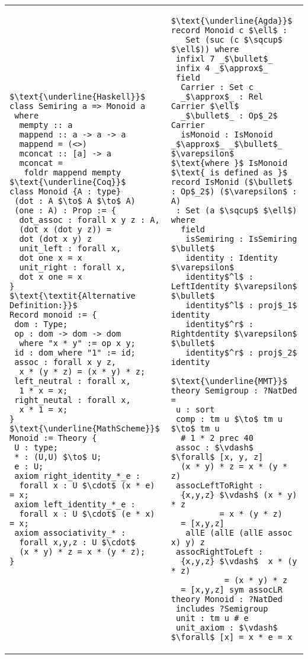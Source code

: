 \footnotesize
\begin{tabular}{p{6.3cm} p{7cm}}
\begin{lstlisting}[mathescape]
$\text{\underline{Haskell}}$
class Semiring a => Monoid a 
 where 
  mempty :: a 
  mappend :: a -> a -> a 
  mappend = (<>) 
  mconcat :: [a] -> a 
  mconcat = 
   foldr mappend mempty 
$\text{\underline{Coq}}$
class Monoid {A : type}
 (dot : A $\to$ A $\to$ A)
 (one : A) : Prop := {
  dot_assoc : forall x y z : A, 
  (dot x (dot y z)) = 
  dot (dot x y) z
  unit_left : forall x, 
  dot one x = x 
  unit_right : forall x, 
  dot x one = x              
}
$\text{\textit{Alternative Definition:}}$
Record monoid := {
 dom : Type; 
 op : dom -> dom -> dom 
  where "x * y" := op x y; 
 id : dom where "1" := id; 
 assoc : forall x y z, 
  x * (y * z) = (x * y) * z; 
 left_neutral : forall x,   
  1 * x = x; 
 right_neutal : forall x,
  x * 1 = x; 
}
$\text{\underline{MathScheme}}$
Monoid := Theory { 
 U : type; 
 * : (U,U) $\to$ U; 
 e : U; 
 axiom right_identity_*_e : 
  forall x : U $\cdot$ (x * e) = x;
 axiom left_identity_*_e :  
  forall x : U $\cdot$ (e * x) = x;
 axiom associativity_* : 
  forall x,y,z : U $\cdot$ 
  (x * y) * z = x * (y * z); 
}
\end{lstlisting}
&
\begin{lstlisting}[mathescape]
$\text{\underline{Agda}}$
record Monoid c $\ell$ : 
   Set (suc (c $\sqcup$ $\ell$)) where 
 infixl 7 _$\bullet$_
 infix 4 _$\approx$_
 field 
  Carrier : Set c 
  _$\approx$_ : Rel Carrier $\ell$ 
  _$\bullet$_ : Op$_2$ Carrier 
  isMonoid : IsMonoid _$\approx$_ _$\bullet$_ $\varepsilon$ 
$\text{where }$ IsMonoid $\text{ is defined as }$
record IsMonid ($\bullet$ : Op$_2$) ($\varepsilon$ : A) 
 : Set (a $\sqcup$ $\ell$) where 
  field 
   isSemiring : IsSemiring $\bullet$ 
   identity : Identity $\varepsilon$ 
   identity$^l$ : LeftIdentity $\varepsilon$ $\bullet$ 
   identity$^l$ : proj$_1$ identity 
   identity$^r$ : Rightdentity $\varepsilon$ $\bullet$ 
   identity$^r$ : proj$_2$ identity           

$\text{\underline{MMT}}$
theory Semigroup : ?NatDed = 
 u : sort 
 comp : tm u $\to$ tm u $\to$ tm u 
  # 1 * 2 prec 40
 assoc : $\vdash$ $\forall$ [x, y, z]
  (x * y) * z = x * (y * z)    
 assocLeftToRight : 
  {x,y,z} $\vdash$ (x * y) * z 
          = x * (y * z) 
  = [x,y,z] 
   allE (allE (allE assoc x) y) z
 assocRightToLeft : 
  {x,y,z} $\vdash$  x * (y * z) 
           = (x * y) * z 
  = [x,y,z] sym assocLR 
theory Monoid : ?NatDed 
 includes ?Semigroup 
 unit : tm u # e 
 unit_axiom : $\vdash$ $\forall$ [x] = x * e = x       
\end{lstlisting}       
\end{tabular}  
